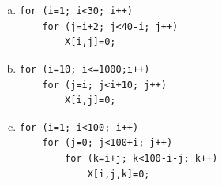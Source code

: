 \documentclass[11pt]{article}
\begin{document}
\section{}
\begin{enumerate}[a)]
	\item
	      \begin{verbatim}
for (i=1; i<30; i++)
    for (j=i+2; j<40-i; j++)
        X[i,j]=0;
\end{verbatim}

	\item
	      \begin{verbatim}
for (i=10; i<=1000;i++) 
    for (j=i; j<i+10; j++)
        X[i,j]=0;
\end{verbatim}

	\item
	      \begin{verbatim}
for (i=1; i<100; i++)
    for (j=0; j<100+i; j++)
        for (k=i+j; k<100-i-j; k++) 
            X[i,j,k]=0;
\end{verbatim}

\end{enumerate}
\end{document}
